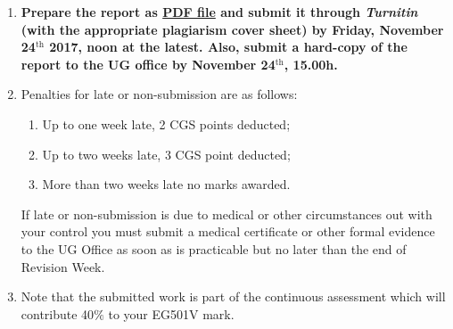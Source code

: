 \documentclass[12pts,a4paper,amsmath,amssymb,floatfix]{article}%
\begin{document}
\begin{enumerate}[1)]
\item {\bf Prepare the report as \underline{PDF file} and submit it through {\it Turnitin} (with the appropriate plagiarism cover sheet) by Friday, November 24$^{\text{th}}$ 2017, noon at the latest. Also, submit a hard-copy of the report to the UG office by November 24$^{\text{th}}$, 15.00h.}
%
%
\item Penalties for late or non-submission are as follows:
\begin{enumerate}%
  \item Up to one week late, 2 CGS points deducted;
  \item Up to two weeks late, 3 CGS point deducted;
  \item More than two weeks late no marks awarded.
\end{enumerate}
If late or non-submission is due to medical or other circumstances out with your control you must submit a medical certificate or other formal evidence to the UG Office as soon as is practicable but no later than the end of Revision Week.

\item Note that the submitted work is part of the continuous assessment which will contribute 40$\%$ to your EG501V mark.

\end{enumerate}
\end{document}
